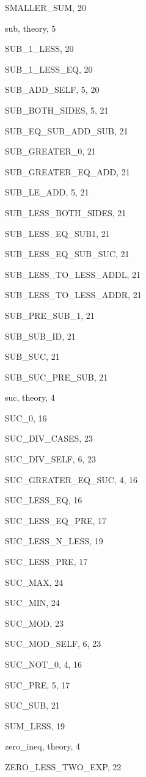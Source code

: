 \begin{theindex}
  \item {\ptt SMALLER\_SUM}, 20
  \item {\ptt sub}, theory, 5
  \item {\ptt SUB\_1\_LESS}, 20
  \item {\ptt SUB\_1\_LESS\_EQ}, 20
  \item {\ptt SUB\_ADD\_SELF}, 5, 20
  \item {\ptt SUB\_BOTH\_SIDES}, 5, 21
  \item {\ptt SUB\_EQ\_SUB\_ADD\_SUB}, 21
  \item {\ptt SUB\_GREATER\_0}, 21
  \item {\ptt SUB\_GREATER\_EQ\_ADD}, 21
  \item {\ptt SUB\_LE\_ADD}, 5, 21
  \item {\ptt SUB\_LESS\_BOTH\_SIDES}, 21
  \item {\ptt SUB\_LESS\_EQ\_SUB1}, 21
  \item {\ptt SUB\_LESS\_EQ\_SUB\_SUC}, 21
  \item {\ptt SUB\_LESS\_TO\_LESS\_ADDL}, 21
  \item {\ptt SUB\_LESS\_TO\_LESS\_ADDR}, 21
  \item {\ptt SUB\_PRE\_SUB\_1}, 21
  \item {\ptt SUB\_SUB\_ID}, 21
  \item {\ptt SUB\_SUC}, 21
  \item {\ptt SUB\_SUC\_PRE\_SUB}, 21
  \item {\ptt suc}, theory, 4
  \item {\ptt SUC\_0}, 16
  \item {\ptt SUC\_DIV\_CASES}, 23
  \item {\ptt SUC\_DIV\_SELF}, 6, 23
  \item {\ptt SUC\_GREATER\_EQ\_SUC}, 4, 16
  \item {\ptt SUC\_LESS\_EQ}, 16
  \item {\ptt SUC\_LESS\_EQ\_PRE}, 17
  \item {\ptt SUC\_LESS\_N\_LESS}, 19
  \item {\ptt SUC\_LESS\_PRE}, 17
  \item {\ptt SUC\_MAX}, 24
  \item {\ptt SUC\_MIN}, 24
  \item {\ptt SUC\_MOD}, 23
  \item {\ptt SUC\_MOD\_SELF}, 6, 23
  \item {\ptt SUC\_NOT\_0}, 4, 16
  \item {\ptt SUC\_PRE}, 5, 17
  \item {\ptt SUC\_SUB}, 21
  \item {\ptt SUM\_LESS}, 19

  \indexspace

  \item {\ptt zero\_ineq}, theory, 4
  \item {\ptt ZERO\_LESS\_TWO\_EXP}, 22

\end{theindex}
